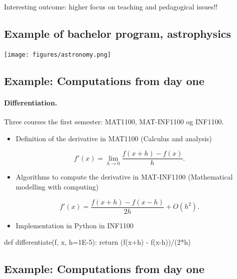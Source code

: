 \documentclass[%
twoside,                 %
final,                   %
10pt]{article}
\begin{document}
\noindent
Interesting outcome: higher focus on teaching and pedagogical issues!!




\subsection{Example of bachelor program, astrophysics}

\paragraph{}


\centerline{\texttt{[image: figures/astronomy.png]}}




\subsection{Example: Computations from day one}

\paragraph{Differentiation.}
Three courses the first semester:  MAT1100, MAT-INF1100 og INF1100.
\begin{itemize}
\item Definition  of the derivative in  MAT1100 (Calculus and analysis) 
\end{itemize}

\noindent
\[
 f'(x)=\lim_{h \rightarrow 0}\frac{f(x+h)-f(x)}{h}.
\]
\begin{itemize}
\item Algorithms to compute the derivative in MAT-INF1100  (Mathematical modelling with computing)
\end{itemize}

\noindent
\[
 f'(x)= \frac{f(x+h)-f(x-h)}{2h}+O(h^2).
\]
\begin{itemize}
\item Implementation in Python in INF1100
\end{itemize}

\noindent
\bpycod
def differentiate(f, x, h=1E-5):
     return (f(x+h) - f(x-h))/(2*h)
\epycod



\subsection{Example: Computations from day one}
\end{document}
